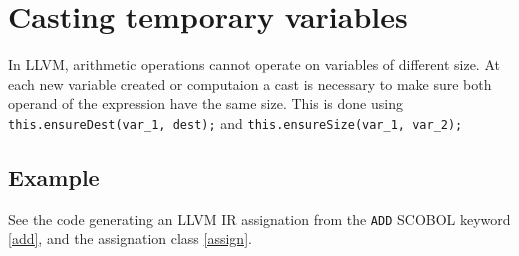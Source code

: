 \section{Casting temporary variables}

In LLVM, arithmetic operations cannot operate on variables of different size. At each new variable created or computaion a cast is necessary to make sure both operand of the expression have the same size. This is done using \verb!this.ensureDest(var_1, dest);! and \verb!this.ensureSize(var_1, var_2);!

\subsection{Example}
See the code generating an LLVM IR assignation from the \verb!ADD! SCOBOL keyword \ref{add}, and the assignation class \ref{assign}.




